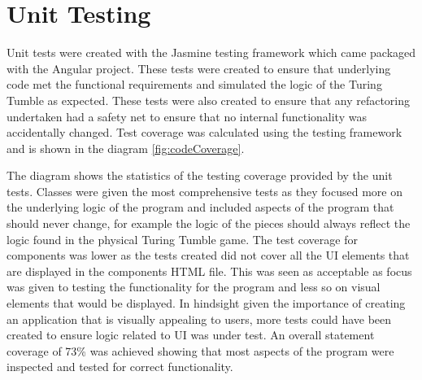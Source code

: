 \documentclass{l4proj}
\begin{document}
\section{Unit Testing}
Unit tests were created with the Jasmine testing framework which came packaged with the Angular project. These tests were created to ensure that underlying code met the functional requirements and simulated the logic of the Turing Tumble as expected. These tests were also created to ensure that any refactoring undertaken had a safety net to ensure that no internal functionality was accidentally changed. Test coverage was calculated using the testing framework and is shown in the diagram \ref{fig:codeCoverage}. 

The diagram shows the statistics of the testing coverage provided by the unit tests. Classes were given the most comprehensive tests as they focused more on the underlying logic of the program and included aspects of the program that should never change, for example the logic of the pieces should always reflect the logic found in the physical Turing Tumble game. The test coverage for components was lower as the tests created did not cover all the UI elements that are displayed in the components HTML file. This was seen as acceptable as focus was given to testing the functionality for the program and less so on visual elements that would be displayed. In hindsight given the importance of creating an application that is visually appealing to users, more tests could have been created to ensure logic related to UI was under test. An overall statement coverage of 73\% was achieved showing that most aspects of the program were inspected and tested for correct functionality.
\end{document}
